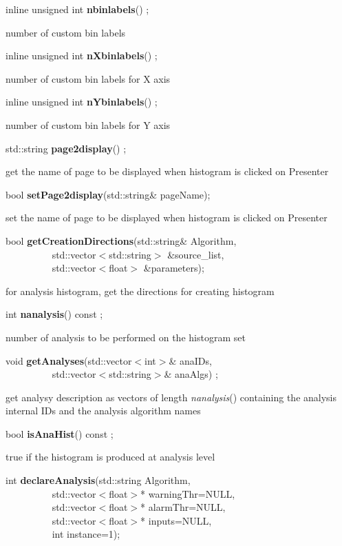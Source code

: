 \item    inline unsigned int {\bf nbinlabels}() ;

 number of custom bin labels


\item    inline unsigned int {\bf nXbinlabels}() ;

 number of custom bin labels for X axis


\item    inline unsigned int {\bf nYbinlabels}() ;

 number of custom bin labels for Y axis


\item    std::string {\bf page2display}() ;

 get the name of page to be displayed when histogram is clicked on Presenter


\item    bool {\bf setPage2display}(std::string\& pageName);


 set the name of page to be displayed when histogram is clicked on Presenter


\item    bool {\bf getCreationDirections}(std::string\& Algorithm,\\\mbox{}~~~~~~~~~
			     std::vector$<$std::string$>$ \&source\_list,\\\mbox{}~~~~~~~~~
			     std::vector$<$float$>$ \&parameters);

 for analysis histogram, get the directions for creating histogram


\item    int {\bf nanalysis}() const ;

 number of analysis to be performed on the histogram set


\item    void {\bf getAnalyses}(std::vector$<$int$>$\& anaIDs,\\\mbox{}~~~~~~~~~
		   std::vector$<$std::string$>$\& anaAlgs) ;

 get analysy description as vectors of length {\it  nanalysis}() containing 
 the analysis internal IDs and the analysis algorithm names


\item    bool {\bf isAnaHist}() const ;

 true if the histogram is produced at analysis level


\item    int {\bf declareAnalysis}(std::string Algorithm,\\\mbox{}~~~~~~~~~ 
                      std::vector$<$float$>$* warningThr=NULL,\\\mbox{}~~~~~~~~~ 
                      std::vector$<$float$>$* alarmThr=NULL,\\\mbox{}~~~~~~~~~ 
                      std::vector$<$float$>$* inputs=NULL,\\\mbox{}~~~~~~~~~ 
                      int instance=1);

